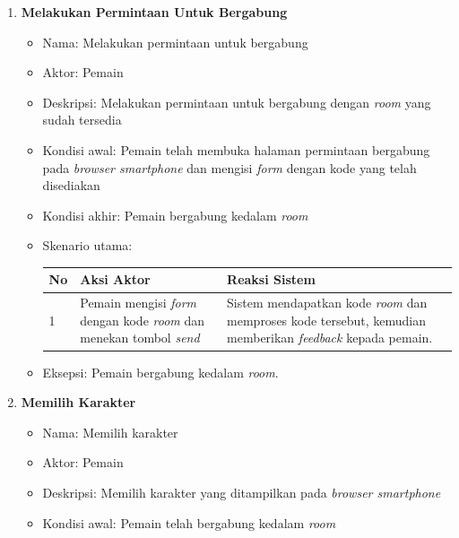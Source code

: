 \begin{enumerate}
	\item \textbf{Melakukan Permintaan Untuk Bergabung}
	
	\begin{itemize}
		\item Nama: Melakukan permintaan untuk bergabung
		
		\item Aktor: Pemain
		
		\item Deskripsi: Melakukan permintaan untuk bergabung dengan \textit{room} yang sudah tersedia
		
		\item Kondisi awal: Pemain telah membuka halaman permintaan bergabung pada \textit{browser smartphone} dan mengisi \textit{form} dengan kode yang telah disediakan
		
		\item Kondisi akhir: Pemain bergabung kedalam \textit{room}
		
		\item Skenario utama: 
		

\begin{tabular}{ |p{1cm}|p{4cm}|p{4cm}|}
	\hline
	No & Aksi Aktor & Reaksi Sistem \\ \hline
	1 & Pemain mengisi \textit{form} dengan kode \textit{room} dan menekan tombol \textit{send} & Sistem mendapatkan kode \textit{room} dan memproses kode tersebut, kemudian memberikan \textit{feedback} kepada pemain. \\ \hline
\end{tabular}

		\item Eksepsi: Pemain bergabung kedalam \textit{room}.

		
	\end{itemize}
	
	\item \textbf{Memilih Karakter}
	
	\begin{itemize}
		\item Nama: Memilih karakter
		
		\item Aktor: Pemain
		
		\item Deskripsi: Memilih karakter yang ditampilkan pada \textit{browser smartphone}
		
		\item Kondisi awal: Pemain telah bergabung kedalam \textit{room}
		

\end{itemize}
\end{enumerate}
